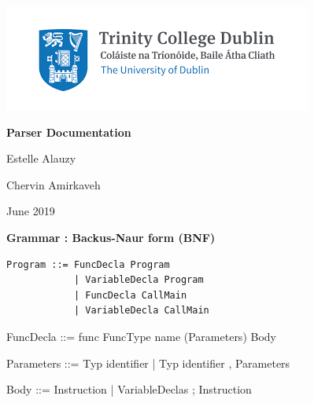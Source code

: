 \documentclass[11pt]{report}
\begin{document}
\begin{center}
\includegraphics[scale = 1]{index.png}
\end{center}

\pagestyle{empty}


\centerline{\textbf{\Huge Parser Documentation}}
\bigbreak\bigbreak
\bigbreak\bigbreak

\centerline{ {\Large Estelle Alauzy}}
\centerline{ {\Large  Chervin Amirkaveh}}


 \vfill
\centerline{\large June 2019}






\newpage
\centerline{\textbf{\Huge Grammar : Backus-Naur form (BNF)}}
\vspace*{3pt}
\vspace*{3pt}
\begin{Verbatim}[fontfamily=textsf]
Program ::= FuncDecla Program
            | VariableDecla Program
            | FuncDecla CallMain
            | VariableDecla CallMain
\end{Verbatim}
\vspace*{3pt}

\begin{verbnobox}[\normalfont]
FuncDecla ::= func FuncType name (Parameters) Body
\end{verbnobox}
\vspace*{3pt}

\begin{verbnobox}[\normalfont]
Parameters ::= Typ identifier | Typ identifier , Parameters
\end{verbnobox}
\vspace*{3pt}

\begin{verbnobox}[\normalfont]
Body ::= { Instruction } | { VariableDeclas ; Instruction }
\end{verbnobox}
\vspace*{3pt}
\end{document}
